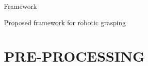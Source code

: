 \documentclass[xcolor=table,compress,blue]{beamer}
\begin{document}
\subsection{}
\begin{frame}{Framework}
	\begin{exampleblock}{Proposed framework for robotic grasping}
		
	
	\end{exampleblock}
\end{frame}



\section{PRE-PROCESSING}
\end{document}
